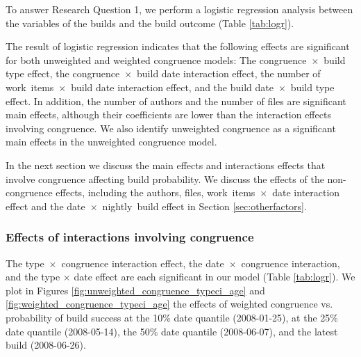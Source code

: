 To answer Research Question 1, we perform a logistic regression analysis between the variables of the builds and the build outcome (Table \ref{tab:logr}).



The result of logistic regression indicates that the following effects are significant for both unweighted and weighted congruence models: The congruence~$\times$~build type effect, the congruence~$\times$~build date interaction effect, the number of work~items~$\times$~build date interaction effect, and the build date~$\times$~build type effect. In addition, the number of authors and the number of files are significant main effects, although their coefficients are lower than the interaction effects involving congruence. We also identify unweighted congruence as a significant main effects in the unweighted congruence model.

In the next section we discuss the main effects and interactions effects that involve congruence affecting build probability. We discuss the effects of the non-congruence effects, including the authors, files, work~items~$\times$~date interaction effect and the date~$\times$~nightly~build effect in Section \ref{sec:otherfactors}.

\subsubsection{Effects of interactions involving congruence}
\label{sec:congruenceinteractions}

The type~$\times$~congruence interaction effect, the date~$\times$~congruence interaction, and the type $\times$ date effect are each significant in our model (Table \ref{tab:logr}). We plot in Figures \ref{fig:unweighted_congruence_typeci_age} and \ref{fig:weighted_congruence_typeci_age} the effects of weighted congruence vs. probability of build success at the 10\% date quantile (2008-01-25), at the 25\% date quantile (2008-05-14), the 50\% date quantile (2008-06-07), and the latest build (2008-06-26).


